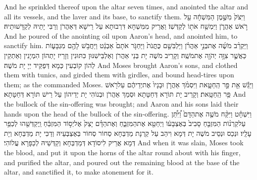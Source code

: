 {And he sprinkled thereof upon the altar seven times, and anointed the altar and all its vessels, and the laver and its base, to sanctify them.}{}
{וַיִּצֹק֙ מִשֶּׁ֣מֶן הַמִּשְׁחָ֔ה עַ֖ל רֹ֣אשׁ אַהֲרֹ֑ן וַיִּמְשַׁ֥ח אֹת֖וֹ לְקַדְּשֽׁוֹ׃}
{וַאֲרֵיק מִמִּשְׁחָא דִּרְבוּתָא עַל רֵישָׁא דְּאַהֲרֹן וְרַבִּי יָתֵיהּ לְקַדָּשׁוּתֵיהּ׃}
{And he poured of the anointing oil upon Aaron’s head, and anointed him, to sanctify him.}{}
{וַיַּקְרֵ֨ב מֹשֶׁ֜ה אֶת\maqqaf בְּנֵ֣י אַהֲרֹ֗ן וַיַּלְבִּשֵׁ֤ם כֻּתֳּנֹת֙ וַיַּחְגֹּ֤ר אֹתָם֙ אַבְנֵ֔ט וַיַּחֲבֹ֥שׁ לָהֶ֖ם מִגְבָּע֑וֹת כַּאֲשֶׁ֛ר צִוָּ֥ה יְהֹוָ֖ה אֶת\maqqaf מֹשֶֽׁה׃}
{וְקָרֵיב מֹשֶׁה יָת בְּנֵי אַהֲרֹן וְאַלְבֵּישִׁנּוּן כִּתּוּנִין וְזָרֵיז יָתְהוֹן הִמְיָנִין וְאַתְקֵין לְהוֹן קוֹבְעִין כְּמָא דְּפַקֵּיד יְיָ יָת מֹשֶׁה׃}
{And Moses brought Aaron’s sons, and clothed them with tunics, and girded them with girdles, and bound head-tires upon them; as the \lord\space commanded Moses.}{}
{וַיַּגֵּ֕שׁ אֵ֖ת פַּ֣ר הַֽחַטָּ֑את וַיִּסְמֹ֨ךְ אַהֲרֹ֤ן וּבָנָיו֙ אֶת\maqqaf יְדֵיהֶ֔ם עַל\maqqaf רֹ֖אשׁ פַּ֥ר הַֽחַטָּֽאת׃}
{וְקָרֵיב יָת תּוֹרָא דְּחַטָּתָא וּסְמַךְ אַהֲרֹן וּבְנוֹהִי יָת יְדֵיהוֹן עַל רֵישׁ תּוֹרָא דְּחַטָּתָא׃}
{And the bullock of the sin-offering was brought; and Aaron and his sons laid their hands upon the head of the bullock of the sin-offering.}{}
{וַיִּשְׁחָ֗ט וַיִּקַּ֨ח מֹשֶׁ֤ה אֶת\maqqaf הַדָּם֙ וַ֠יִּתֵּ֠ן עַל\maqqaf קַרְנ֨וֹת הַמִּזְבֵּ֤חַ סָבִיב֙ בְּאֶצְבָּע֔וֹ וַיְחַטֵּ֖א אֶת\maqqaf הַמִּזְבֵּ֑חַ וְאֶת\maqqaf הַדָּ֗ם יָצַק֙ אֶל\maqqaf יְס֣וֹד הַמִּזְבֵּ֔חַ וַֽיְקַדְּשֵׁ֖הוּ לְכַפֵּ֥ר עָלָֽיו׃}
{וּנְכַס וּנְסֵיב מֹשֶׁה יָת דְּמָא וִיהַב עַל קַרְנָת מַדְבְּחָא סְחוֹר סְחוֹר בְּאֶצְבְּעֵיהּ וְדַכִּי יָת מַדְבְּחָא וְיָת דְּמָא אֲרֵיק לִיסוֹדָא דְּמַדְבְּחָא וְקַדְּשֵׁיהּ לְכַפָּרָא עֲלוֹהִי׃}
{And when it was slain, Moses took the blood, and put it upon the horns of the altar round about with his finger, and purified the altar, and poured out the remaining blood at the base of the altar, and sanctified it, to make atonement for it.}{}

